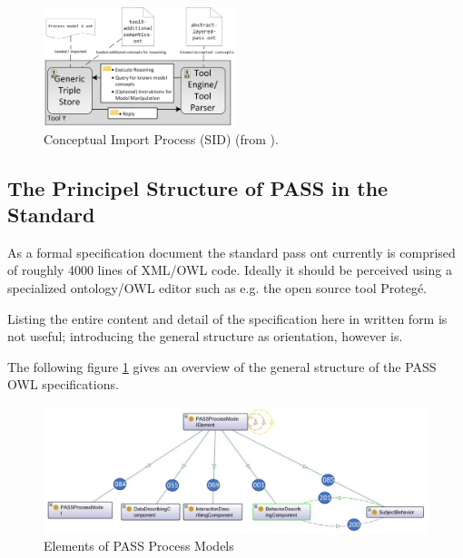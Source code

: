 \begin{figure}[ht]
	\centering
	\includegraphics[width=0.50\textwidth]{Figures/Ontology/Introduction/importWorkflow.png}
	\caption{Conceptual Import Process (SID) (from \cite{elster:ont}). }
\end{figure}



\subsection{The Principel Structure of PASS in the Standard }

As a formal specification document the standard pass ont currently is comprised of roughly 4000 lines of XML/OWL code. Ideally it should be perceived using a specialized ontology/OWL editor such as e.g. the open source tool Protegé. 

Listing the entire content and detail of the specification here in written form is not useful; introducing the general structure as orientation, however is. 

The following figure \ref{fig:20171217-passprocessmodellelement} gives an overview of the general structure of the PASS OWL specifications. 


\begin{figure}[htbp]
	\centering
	\includegraphics[width=0.9\linewidth]{Figures/Ontology/SubjectInteraction/20171217-PASSProcessModellElement}
	\caption[Elements of PASS Process Models]{Elements of PASS Process Models}
	\label{fig:20171217-passprocessmodellelement}
\end{figure}


